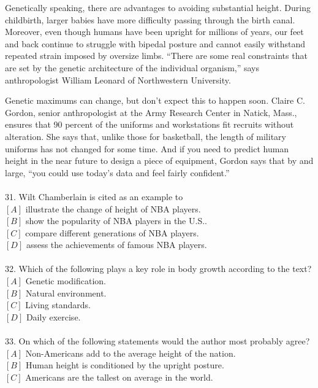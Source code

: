 \documentclass[a4paper]{ctexart}
\begin{document}
\par
Genetically speaking, there are advantages to avoiding substantial height. During childbirth, larger babies have more difficulty passing through the birth canal. Moreover, even though humans have been upright for millions of years, our feet and back continue to struggle with bipedal posture and cannot easily withstand repeated strain imposed by oversize limbs. “There are some real constraints that are set by the genetic architecture of the individual organism,” says anthropologist William Leonard of Northwestern University.
\par
Genetic maximums can change, but don’t expect this to happen soon. Claire C. Gordon, senior anthropologist at the Army Research Center in Natick, Mass., ensures that 90 percent of the uniforms and workstations fit recruits without alteration. She says that, unlike those for basketball, the length of military uniforms has not changed for some time. And if you need to predict human height in the near future to design a piece of equipment, Gordon says that by and large, “you could use today’s data and feel fairly confident.”
\\\\
31.	Wilt Chamberlain is cited as an example to\\
$[A]$ illustrate the change of height of NBA players.\\
$[B]$ show the popularity of NBA players in the U.S..\\
$[C]$ compare different generations of NBA players.\\
$[D]$ assess the achievements of famous NBA players.\\
\\
32.	Which of the following plays a key role in body growth according to the text?\\
$[A]$ Genetic modification.\\
$[B]$ Natural environment.\\
$[C]$ Living standards.\\
$[D]$ Daily exercise.\\
\\
33.	On which of the following statements would the author most probably agree?\\
$[A]$ Non-Americans add to the average height of the nation.\\
$[B]$ Human height is conditioned by the upright posture.\\
$[C]$ Americans are the tallest on average in the world.\\
\end{document}
